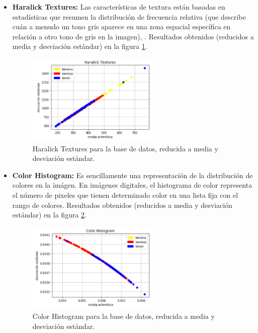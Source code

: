 \documentclass[10pt,a4paper]{article}
\begin{document}
\begin{itemize}
\item \textbf{Haralick Textures:} Las características de textura están basadas en estadísticas  que resumen la distribución de frecuencia relativa (que describe cuán a menudo un tono gris aparece en una zona espacial específica en relación a otro tono de gris en la imagen), \textcite{haralick}. Resultados obtenidos (reducidos a media y desviación estándar) en la figura \ref{haralick_textures}.

\begin{figure}[h]
\centering
\includegraphics[width=0.6\textwidth]{imgs/resultado-04_ht.png}
\caption{Haralick Textures para la base de datos, reducida a media y desviación estándar.}
\label{haralick_textures}
\end{figure}

\item \textbf{Color Histogram:} Es sencillamente una representación de la distribución de colores en la imágen. En imágenes digitales, el histograma de color representa el número de pixeles que tienen determinado color en una lista fija con el rango de colores. Resultados obtenidos (reducidos a media y desviación estándar) en la figura \ref{color_histogram}.

\begin{figure}[h]
\centering
\includegraphics[width=0.6\textwidth]{imgs/resultado-04_ch.png}
\caption{Color Histogram para la base de datos, reducida a media y desviación estándar.}
\label{color_histogram}
\end{figure}

\end{itemize}
\end{document}
